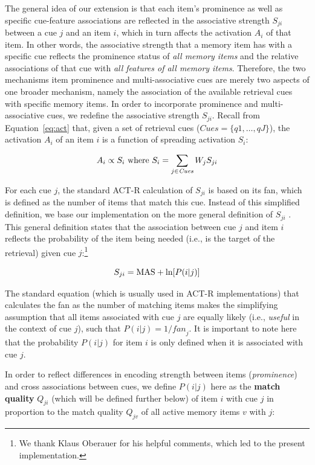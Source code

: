 \documentclass{cambridge7A}\usepackage[]{graphicx}\usepackage[]{color}
\begin{document}
The general idea of our extension is that each item's prominence as well as specific cue-feature associations are reflected in the associative strength $S_{ji}$ between a cue $j$ and an item $i$, which in turn affects the activation $A_i$ of that item.
In other words, the associative strength that a memory item has with a specific cue reflects the prominence status of \emph{all memory items} and the relative associations of that cue with \emph{all features of all memory items}.
Therefore, the two mechanisms item prominence and multi-associative cues are merely two aspects of one broader mechanism, namely the association of the available retrieval cues with specific memory items.
In order to incorporate prominence and multi-associative cues, we redefine the associative strength $S_{ji}$.
Recall from Equation~\ref{eq:act} that, given a set of retrieval cues ($\textit{Cues} = \{q1,\dots,qJ\}$), the activation $A_i$ of an item $i$ is a function of spreading activation $S_i$:

\begin{equation}
A_i \propto S_i \hbox{ where } S_i = \sum\limits_{j \in \textit{Cues}} W_j S_{ji}
\end{equation}

  
For each cue $j$, the standard ACT-R calculation of $S_{ji}$ is based on its fan, which is defined as the number of items that match this cue. 
Instead of this simplified definition, we base our implementation on the more general definition of $S_{ji}$ \citep[p.\ 129]{SchneiderAnderson2012}. This general definition states that the association between cue $j$ and item $i$ reflects the probability of the item being needed (i.e., is the target of the retrieval) given cue $j$:\footnote{We thank Klaus Oberauer for his helpful comments, which led to the present implementation.}

\begin{equation}
	S_{ji} = \hbox{MAS} + \hbox{ln}[P(i|j)]
\end{equation}

The standard equation (which is usually used in ACT-R implementations) that calculates the fan as the number of matching items makes the simplifying assumption that all items associated with cue $j$ are equally likely (i.e., \textit{useful} in the context of cue $j$), such that $P(i|j) = 1/\textit{fan}_j$. It is important to note here that the probability $P(i|j)$ for item $i$ is only defined when it is associated with cue $j$.

In order to reflect differences in encoding strength between items (\emph{prominence}) and cross associations between cues, we define $P(i|j)$ here as the  \textbf{match quality} $Q_{ji}$ (which will be defined further below) of item $i$ with cue $j$ in proportion to the match quality $Q_{jv}$ of all active memory items $v$ with $j$:
\end{document}
